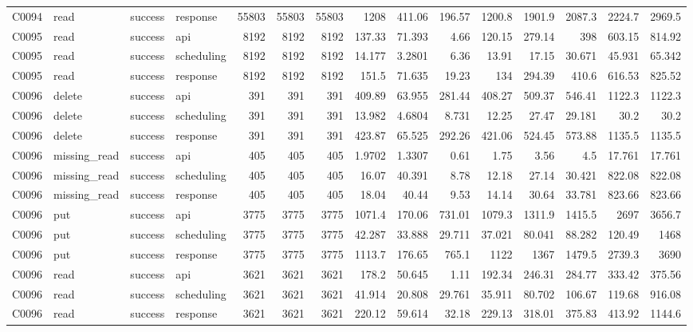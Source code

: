 \begin{landscape}
\begin{longtable}{llllrrrrrrrrrrr}
C0094 & read & success & response & 55803 & 55803 & 55803 & 1208 & 411.06 & 196.57 & 1200.8 & 1901.9 & 2087.3 & 2224.7 & 2969.5\\
C0095 & read & success & api & 8192 & 8192 & 8192 & 137.33 & 71.393 & 4.66 & 120.15 & 279.14 & 398 & 603.15 & 814.92\\
C0095 & read & success & scheduling & 8192 & 8192 & 8192 & 14.177 & 3.2801 & 6.36 & 13.91 & 17.15 & 30.671 & 45.931 & 65.342\\
C0095 & read & success & response & 8192 & 8192 & 8192 & 151.5 & 71.635 & 19.23 & 134 & 294.39 & 410.6 & 616.53 & 825.52\\
C0096 & delete & success & api & 391 & 391 & 391 & 409.89 & 63.955 & 281.44 & 408.27 & 509.37 & 546.41 & 1122.3 & 1122.3\\
C0096 & delete & success & scheduling & 391 & 391 & 391 & 13.982 & 4.6804 & 8.731 & 12.25 & 27.47 & 29.181 & 30.2 & 30.2\\
C0096 & delete & success & response & 391 & 391 & 391 & 423.87 & 65.525 & 292.26 & 421.06 & 524.45 & 573.88 & 1135.5 & 1135.5\\
C0096 & missing\_\allowbreak{}read & success & api & 405 & 405 & 405 & 1.9702 & 1.3307 & 0.61 & 1.75 & 3.56 & 4.5 & 17.761 & 17.761\\
C0096 & missing\_\allowbreak{}read & success & scheduling & 405 & 405 & 405 & 16.07 & 40.391 & 8.78 & 12.18 & 27.14 & 30.421 & 822.08 & 822.08\\
C0096 & missing\_\allowbreak{}read & success & response & 405 & 405 & 405 & 18.04 & 40.44 & 9.53 & 14.14 & 30.64 & 33.781 & 823.66 & 823.66\\
C0096 & put & success & api & 3775 & 3775 & 3775 & 1071.4 & 170.06 & 731.01 & 1079.3 & 1311.9 & 1415.5 & 2697 & 3656.7\\
C0096 & put & success & scheduling & 3775 & 3775 & 3775 & 42.287 & 33.888 & 29.711 & 37.021 & 80.041 & 88.282 & 120.49 & 1468\\
C0096 & put & success & response & 3775 & 3775 & 3775 & 1113.7 & 176.65 & 765.1 & 1122 & 1367 & 1479.5 & 2739.3 & 3690\\
C0096 & read & success & api & 3621 & 3621 & 3621 & 178.2 & 50.645 & 1.11 & 192.34 & 246.31 & 284.77 & 333.42 & 375.56\\
C0096 & read & success & scheduling & 3621 & 3621 & 3621 & 41.914 & 20.808 & 29.761 & 35.911 & 80.702 & 106.67 & 119.68 & 916.08\\
C0096 & read & success & response & 3621 & 3621 & 3621 & 220.12 & 59.614 & 32.18 & 229.13 & 318.01 & 375.83 & 413.92 & 1144.6\\

\end{longtable}
\end{landscape}

